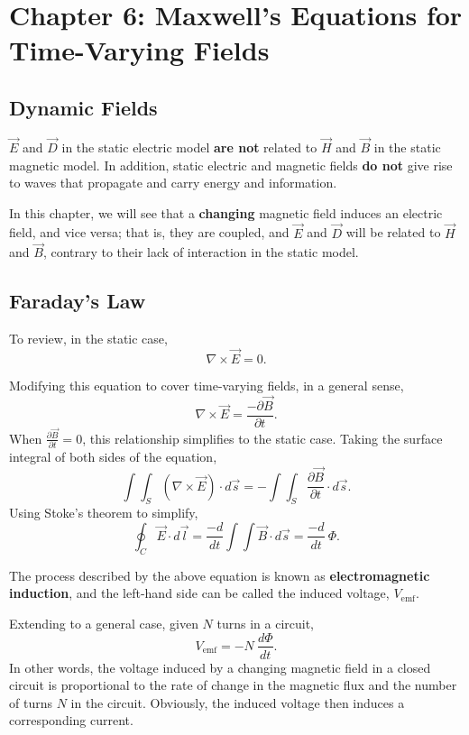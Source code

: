 \documentclass{article}
\begin{document}
\setcounter{section}{5}
\section{Chapter 6: Maxwell's Equations for Time-Varying Fields}
\setcounter{subsection}{-1}
\subsection{Dynamic Fields}
\(\vec{E}\) and \(\vec{D}\) in the static electric model \textbf{are not} related to \(\vec{H}\) and \(\vec{B}\) in the static magnetic model. In addition, static electric and magnetic fields \textbf{do not} give rise to waves that propagate and carry energy and information.

In this chapter, we will see that a \textbf{changing} magnetic field induces an electric field, and vice versa; that is, they are coupled, and \(\vec{E}\) and \(\vec{D}\) will be related to \(\vec{H}\) and \(\vec{B}\), contrary to their lack of interaction in the static model.

\subsection{Faraday's Law}

To review, in the static case, 
\[
  \nabla \times \vec{E} = 0.
\]

Modifying this equation to cover time-varying fields, in a general sense, 
\[
  \nabla \times \vec{E} = \frac{-\partial \vec{B}}{\partial t}.
\]
When \(\frac{\partial \vec{B}}{\partial t} = 0\), this relationship simplifies to the static case. Taking the surface integral of both sides of the equation,
\[
  \int \int_S (\nabla \times \vec{E}) \cdot d \vec{s} = - \int \int_S \frac{\partial \vec{B}}{\partial t} \cdot d \vec{s}.
\]
Using Stoke's theorem to simplify, 
\[
  \oint_C \vec{E} \cdot d \vec{l} = \frac{-d}{dt} \int \int \vec{B} \cdot d \vec{s} = \frac{-d}{dt} \ \Phi.
\]

The process described by the above equation is known as \textbf{electromagnetic induction}, and the left-hand side can be called the induced voltage, \(V_{\mathrm{emf}}\).

Extending to a general case, given \(N\) turns in a circuit, 
\[
	V_{\mathrm{emf}} = -N \ \frac{d\Phi}{dt}.
\]
In other words, the voltage induced by a changing magnetic field in a closed circuit is proportional to the rate of change in the magnetic flux and the number of turns \(N\) in the circuit. Obviously, the induced voltage then induces a corresponding current.
\end{document}
